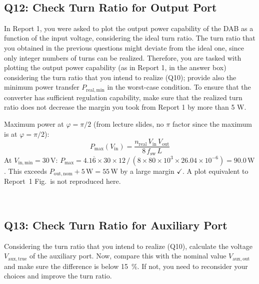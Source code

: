 \documentclass{PELsmallreport}
\begin{document}
  \qquad \qquad
{}  \hfill{}\\



\subsection{Q12: Check Turn Ratio for Output Port} 
In Report 1, you were asked to plot the output power capability of the DAB as a function of the input voltage, considering the ideal turn ratio. 
The turn ratio that you obtained in the previous questions might deviate from the ideal one, since only integer numbers of turns can be realized. 
Therefore, you are tasked with plotting the output power capability (as in Report 1, in the answer box) considering the turn ratio that you intend to realize (Q10); provide also the minimum power transfer $P_\mathrm{real,min}$ in the worst-case condition.
To ensure that the converter has sufficient regulation capability, make sure that the realized turn ratio does not decrease the margin you took from Report 1 by more than 5 W. 

\begin{framed}
Maximum power at $\varphi = \pi/2$ (from lecture slides, no $\pi$ factor since the maximum is at $\varphi = \pi/2$):
\begin{equation}
    P_\mathrm{max}(V_\mathrm{in}) = \frac{n_\mathrm{real}\,V_\mathrm{in}\,V_\mathrm{out}}{8\,f_\mathrm{sw}\,L}
\end{equation}
At $V_\mathrm{in,min}=30\,\mathrm{V}$: $P_\mathrm{max} = 4.1\overline{6}\times30\times12\,/\,(8\times80\times10^3\times26.04\times10^{-6}) = 90.0\,\mathrm{W}$.
This exceeds $P_\mathrm{out,nom}+5\,\mathrm{W}=55\,\mathrm{W}$ by a large margin $\checkmark$. A plot equivalent to Report~1 Fig.\ is not reproduced here.
\end{framed}

  \hfill{}\\



\subsection{Q13: Check Turn Ratio for Auxiliary Port} 
Considering the turn ratio that you intend to realize (Q10), calculate the voltage $V_\mathrm{aux,true}$ of the auxiliary port. 
Now, compare this with the nominal value $V_\mathrm{aux,out}$ and make sure the difference is below \qty{15}{\percent}. 
If not, you need to reconsider your choices and improve the turn ratio.  
\end{document}
